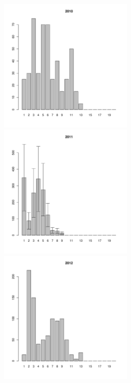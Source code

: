\documentclass[12pt, a4paper]{article}
\begin{document}
\begin{figure}[h]

\begin{multicols}{3}
\hfill
\includegraphics[width=65mm]{../White_Sea/Luvenga_Goreliy/high_2010_.pdf}
\hfill
\end{multicols}

\begin{multicols}{3}
\hfill
\includegraphics[width=65mm]{../White_Sea/Luvenga_Goreliy/high_2011_.pdf}
\end{multicols}



\begin{multicols}{3}
\hfill
\includegraphics[width=65mm]{../White_Sea/Luvenga_Goreliy/high_2012_.pdf}
\end{multicols}


\end{figure}
\end{document}
